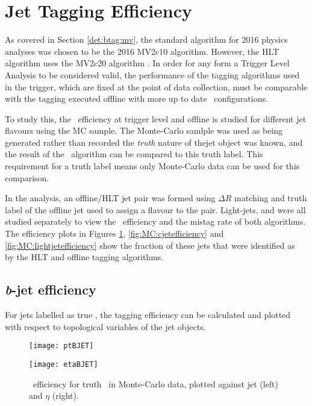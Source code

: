 \section{Jet Tagging Efficiency}

	As covered in Section  \ref{det:btag:mv}, the standard algorithm for 2016 physics analyses was chosen to be the 2016 MV2c10 algorithm. However, the HLT \btag\, algorithm uses the MV2c20 algorithm \cite{trig2015}. In order for any form a Trigger Level Analysis to be considered valid, the performance of the tagging algorithms used in the trigger, which are fixed at the point of data collection, must be comparable with the tagging executed offline with more up to date \btag\, configurations.

	To study this, the \btag\, efficiency at trigger level and offline is studied for different jet flavours using the MC sample. The Monte-Carlo samlple was used as being generated rather than recorded the \textit{truth} nature of thejet object was known, and the result of the \btag\, algorithm can be compared to this truth label. This requirement for a truth label means only Monte-Carlo data can be used for this comparison.

	In the analysis, an offline/HLT jet pair was formed using $\Delta R$ matching and truth label of the offline jet used to assign a flavour to the pair. Light-jets, \bjets and \cjets were all studied separately to view the \btag\, efficiency and the mistag rate of both algorithms. The efficiency plots in Figures \ref{fig:MC:bjetefficiency}, \ref{fig:MC:cjetefficiency} and \ref{fig:MC:lightjetefficiency} show the fraction of these jets that were identified as \bjets\, by the HLT and offline tagging algorithms.

	\newpage
	\subsection{\textit{b}-jet efficiency}

	For jets labelled as true \bjets, the tagging efficiency can be calculated and plotted with respect to topological variables of the jet objects.

		\begin{figure}[h]
			\centering
			\begin{minipage}[h]{0.48\linewidth}
				\texttt{[image: ptBJET]}

			\end{minipage}
			\quad
			\begin{minipage}[h]{0.48\linewidth}
				\texttt{[image: etaBJET]}
			\end{minipage}
			\caption{\btag\, efficiency for truth \bjets\, in Monte-Carlo data, plotted against jet \pt (left) and $\eta$ (right).}
			\label{fig:MC:bjetefficiency}
		\end{figure}

